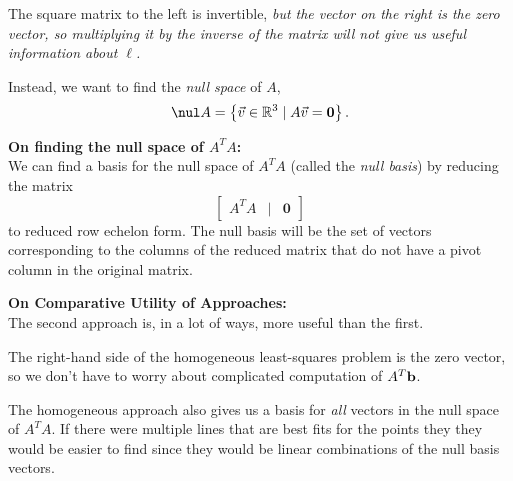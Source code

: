 \begin{problem}
\begin{enumroman}
\begin{answer}
        The square matrix to the left is invertible,
        \emph{
          but the vector on the right is the zero vector,
          so multiplying it by the inverse of the matrix
          will not give us useful information about $\ell$.
        }

        Instead, we want to find the \emph{null space} of $A$,
        \[ \nul A = \set{\vec{v} \in \R^3 \mid A \vec{v} = \mathbf{0}}. \]

        \textbf{On finding the null space of $A^TA$:} \\
        We can find a basis for the null space of $A^TA$
        (called the \emph{null basis}) by reducing the matrix
        \[ \begin{bmatrix}
          A^TA & | & \mathbf{0}
        \end{bmatrix}
        \] to reduced row echelon form.
        The null basis will be the set of vectors corresponding
        to the columns of the reduced matrix that do not have
        a pivot column in the original matrix.

        \textbf{On Comparative Utility of Approaches:}\\
        The second approach is, in a lot of ways, more useful than the first.
        
        \begin{enumarabic}
          \item The right-hand side of the homogeneous least-squares
            problem is the zero vector, so we don't have to worry about
            complicated computation of $A^T \mathbf{b}$.

          \item The homogeneous approach also gives us a basis for \emph{all}
            vectors in the null space of $A^TA$.
            If there were multiple lines that are best fits for the points
            they they would be easier to find since they would be linear
            combinations of the null basis vectors.
        \end{enumarabic}
      \end{answer}
  \end{enumroman}
\end{problem}
